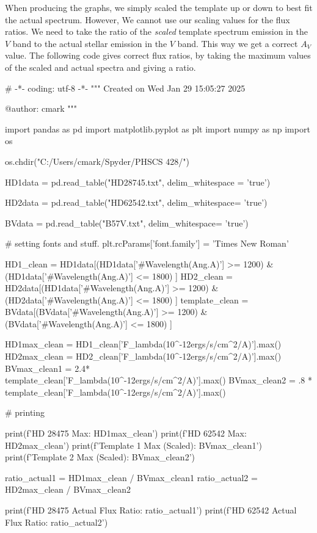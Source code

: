 \documentclass{article}
\begin{document}
    When producing the graphs, we simply scaled the template up or down to best fit the actual spectrum.
    However, We cannot use our scaling values for the flux ratios. We need to take the ratio of the \textit{scaled} template spectrum emission in the $V$ band to the actual stellar emission in the $V$ band.
    This way we get a correct $A_V$ value. The following code gives correct flux ratios, by taking the maximum values of the scaled and actual spectra and giving a ratio.

    \begin{python}
        # -*- coding: utf-8 -*-
        """
        Created on Wed Jan 29 15:05:27 2025

        @author: cmark
        """

        import pandas as pd
        import matplotlib.pyplot as plt
        import numpy as np
        import os

        os.chdir("C:/Users/cmark/Spyder/PHSCS 428/")

        HD1data = pd.read_table("HD28745.txt", delim_whitespace = 'true')

        HD2data = pd.read_table("HD62542.txt", delim_whitespace= 'true')

        BVdata = pd.read_table("B57V.txt", delim_whitespace= 'true')

        # setting fonts and stuff.
        plt.rcParams['font.family'] = 'Times New Roman'
       

        HD1_clean = HD1data[(HD1data['#Wavelength(Ang.A)'] >= 1200) & (HD1data['#Wavelength(Ang.A)'] <= 1800) ]
        HD2_clean = HD2data[(HD1data['#Wavelength(Ang.A)'] >= 1200) & (HD2data['#Wavelength(Ang.A)'] <= 1800) ]
        template_clean = BVdata[(BVdata['#Wavelength(Ang.A)'] >= 1200) & (BVdata['#Wavelength(Ang.A)'] <= 1800) ]

        HD1max_clean = HD1_clean['F_lambda(10^-12ergs/s/cm^2/A)'].max()
        HD2max_clean = HD2_clean['F_lambda(10^-12ergs/s/cm^2/A)'].max()
        BVmax_clean1 = 2.4* template_clean['F_lambda(10^-12ergs/s/cm^2/A)'].max()
        BVmax_clean2 = .8 * template_clean['F_lambda(10^-12ergs/s/cm^2/A)'].max()


        # printing 

        print(f'HD 28475 Max: {HD1max_clean}')
        print(f'HD 62542 Max: {HD2max_clean}')
        print(f'Template 1 Max (Scaled): {BVmax_clean1}')
        print(f'Template 2 Max (Scaled): {BVmax_clean2}')



        ratio_actual1 = HD1max_clean / BVmax_clean1
        ratio_actual2 = HD2max_clean / BVmax_clean2

        print(f'HD 28475 Actual Flux Ratio: {ratio_actual1}')
        print(f'HD 62542 Actual Flux Ratio: {ratio_actual2}')
    \end{python}
\end{document}

